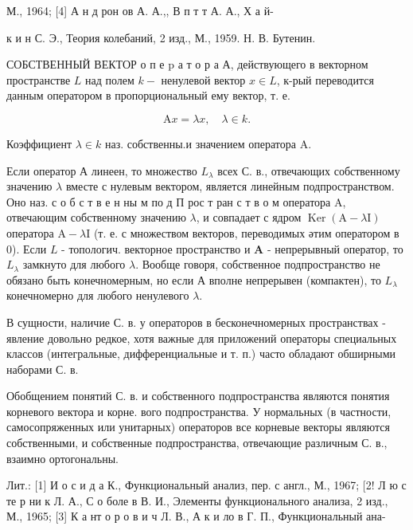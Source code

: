 \documentclass[10pt]{article}
\begin{document}
М., 1964; [4] А н д рон ов А. А.,, В п т т А. А., Х а й-

к и н С. Э., Теория колебаний, 2 изд., М., 1959. Н. В. Бутенин.



СОБСТВЕННЫЙ ВЕКТОР о п е $\mathrm{p}$ а т о р а А, действующего в векторном пространстве $L$ над полем $k-$ ненулевой вектор $x \in L$, к-рый переводится данным оператором в пропорциональный ему вектор, т. е.



\[

\mathrm{A} x=\lambda x, \quad \lambda \in k .

\]



Коэффициент $\lambda \in k$ наз. собственны.и значением оператора A.



Если оператор А линеен, то множество $L_{\lambda}$ всех С. в., отвечающих собственному значению $\lambda$ вместе с нулевым вектором, является линейным подпространством. Оно наз. с о б с т в е н ны м по д П рос т ран с т в о м оператора A, отвечающим собственному значению $\lambda$, и совпадает с ядром $\operatorname{Ker}(\mathrm{A}-\lambda \mathrm{I})$ оператора $\mathrm{A}-\lambda \mathrm{I}$ (т. е. с множеством векторов, переводимых әтим оператором в 0). Если $L$ - топологич. векторное пространство и $\mathbf{A}$ - непрерывный оператор, то $L_{\lambda}$ замкнуто для любого $\lambda$. Вообще говоря, собственное подпространство не обязано быть конечномерным, но если А вполне непрерывен (компактен), то $L_{\lambda}$ конечномерно для любого ненулевого $\lambda$.



В сущности, наличие С. в. у операторов в бесконечномерных пространствах - явление довольно редкое, хотя важные для приложений операторы специальных классов (интегральные, дифференциальные и т. п.) часто обладают обширными наборами С. в.



Обобщением понятий С. в. и собственного подпространства являются понятия корневого вектора и корне. вого подпространства. У нормальных (в частности, самосопряженных или унитарных) операторов все корневые векторы являются собственными, и собственные подпространства, отвечающие различным С. в., взаимно ортогональны.



Лит.: [1] И о с и д а К., Функциональный анализ, пер. с англ., М., 1967; [2! Л ю с те р ни к Л. А., С о боле в В. И., Элементы функционального анализа, 2 изд., М., 1965; [3] К а нт о р о в и ч Л. В., А к и ло в Г. П., Функциональный ана-
\end{document}
